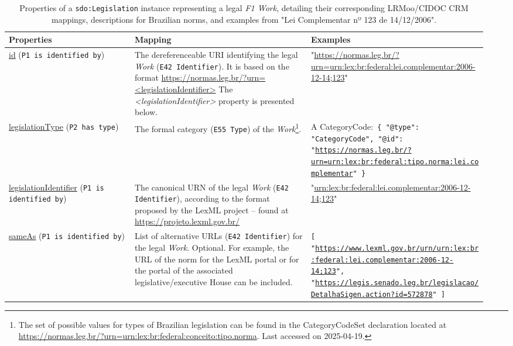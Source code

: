 \documentclass[11pt]{article}
\begin{document}
\begin{longtable}{p{0.25\linewidth} p{0.35\linewidth} p{0.35\linewidth}} 
\caption{Properties of a \texttt{sdo:Legislation} instance representing a legal \textit{F1 Work}, detailing their corresponding LRMoo/CIDOC CRM mappings, descriptions for Brazilian norms, and examples from "Lei Complementar nº 123 de 14/12/2006".}
\label{tab:norm_properties} \\
\toprule
\textbf{Properties} & \textbf{Mapping} & \textbf{Examples} \\
\midrule
\endfirsthead

\url{id} \newline (\texttt{P1 is identified by}) & The dereferenceable URI identifying the legal \emph{Work} (\texttt{E42 Identifier}). \newline It is based on the format \newline \url{https://normas.leg.br/?urn=<legislationIdentifier>} \newline The \emph{<legislationIdentifier>} property is presented below. & "\url{https://normas.leg.br/?urn=urn:lex:br:federal:lei.complementar:2006-12-14;123}" \\
\midrule

\url{legislationType} \newline (\texttt{P2 has type}) & The formal category (\texttt{E55 Type}) of the \emph{Work}\footnote{The set of possible values for types of Brazilian legislation can be found in the CategoryCodeSet declaration located at \url{https://normas.leg.br/?urn=urn:lex:br:federal:conceito:tipo.norma}. Last accessed on 2025-04-19.}. & A CategoryCode:\newline  \texttt{\newline 
\{ \newline
    "@type": "CategoryCode",
    "@id": "\url{https://normas.leg.br/?urn=urn:lex:br:federal:tipo.norma:lei.complementar}" 
\newline \}
}\\
\midrule

\url{legislationIdentifier} \newline (\texttt{P1 is identified by}) & The canonical URN of the legal \emph{Work} (\texttt{E42 Identifier}), according to the format proposed by the LexML project -- found at \url{https://projeto.lexml.gov.br/} & "\url{urn:lex:br:federal:lei.complementar:2006-12-14;123}" \\
\midrule

\url{sameAs} \newline (\texttt{P1 is identified by}) & List of alternative URLs (\texttt{E42 Identifier}) for the legal \emph{Work}. Optional. \newline For example, the URL of the norm for the LexML portal or for the portal of the associated legislative/executive House can be included. & \texttt{[ "\url{https://www.lexml.gov.br/urn/urn:lex:br:federal:lei.complementar:2006-12-14;123}", "\url{https://legis.senado.leg.br/legislacao/DetalhaSigen.action?id=572878}" ]} \\
\midrule


\end{longtable}
\end{document}
